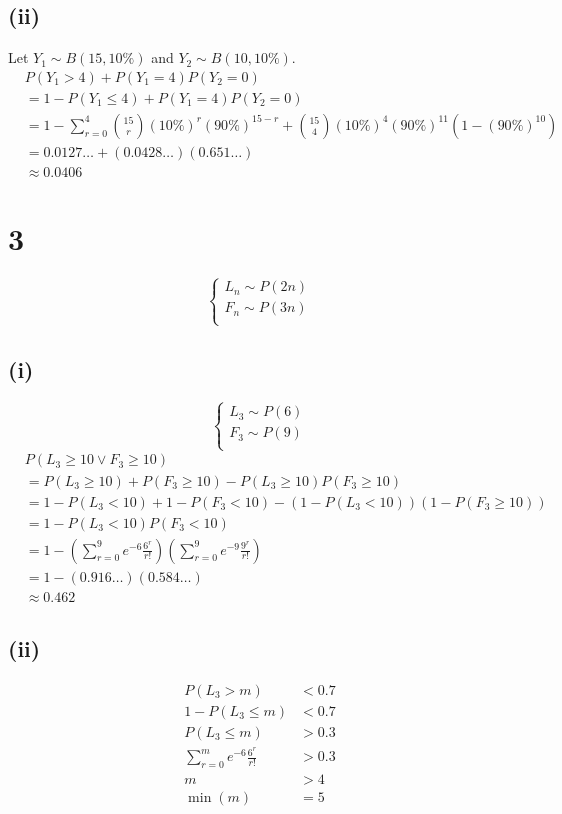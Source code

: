 \documentclass[a4paper]{article}
\begin{document}
\subsection*{(ii)}
Let \(Y_1\sim B(15,10\%)\) and \(Y_2\sim B(10,10\%)\).
\[\begin{aligned}
	&P(Y_1>4)+P(Y_1=4)P(Y_2=0)\\
	&=1-P(Y_1\leqslant4)+P(Y_1=4)P(Y_2=0)\\
	&=1-\sum\limits_{r=0}^4\binom{15}r(10\%)^r(90\%)^{15-r}+\binom{15}4(10\%)^4(90\%)^{11}\left(1-(90\%)^{10}\right)\\
	&=0.0127\dots+(0.0428\dots)(0.651\dots)\\
	&\approx\boxed{0.0406}
\end{aligned}\]

\section*{3}
\[\begin{cases}
	L_n\sim P(2n)\\
	F_n\sim P(3n)\\
\end{cases}\]
\subsection*{(i)}
\[\begin{cases}
	L_3\sim P(6)\\
	F_3\sim P(9)\\
\end{cases}\]
\[\begin{aligned}
	&P(L_3\geqslant10\lor F_3\geqslant10)\\
	&=P(L_3\geqslant10)+P(F_3\geqslant10)-P(L_3\geqslant10)P(F_3\geqslant10)\\
	&=1-P(L_3<10)+1-P(F_3<10)-(1-P(L_3<10))(1-P(F_3\geqslant10))\\
	&=1-P(L_3<10)P(F_3<10)\\
	&=1-\left(\sum\limits_{r=0}^9e^{-6}\frac{6^r}{r!}\right)\left(\sum\limits_{r=0}^9e^{-9}\frac{9^r}{r!}\right)\\
	&=1-(0.916\dots)(0.584\dots)\\
	&\approx\boxed{0.462}
\end{aligned}\]
\subsection*{(ii)}
\[\begin{aligned}
	P(L_3>m)&<0.7\\
	1-P(L_3\leqslant m)&<0.7\\
	P(L_3\leqslant m)&>0.3\\
	\sum\limits_{r=0}^me^{-6}\frac{6^r}{r!}&>0.3\\
	m&>4\\
	\min(m)&=\boxed5
\end{aligned}\]
\end{document}
